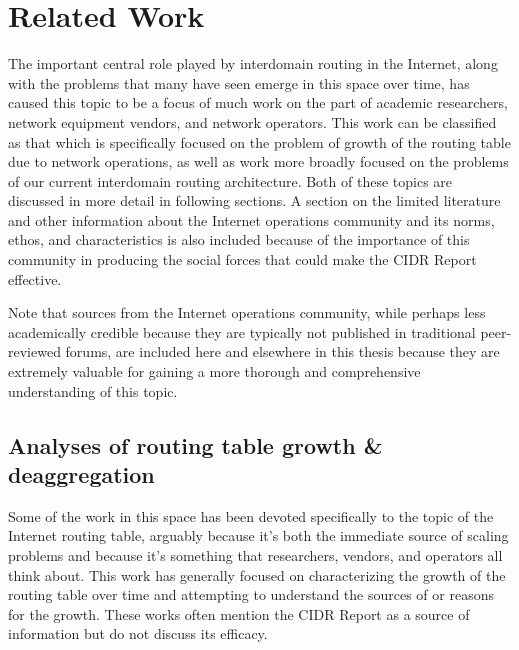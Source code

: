 \chapter{Related Work}
\label{chap:relwork}

The important central role played by interdomain routing in the Internet, along with the problems that many have seen emerge in this space over time, has caused this topic to be a focus of much work on the part of academic researchers, network equipment vendors, and network operators. This work can be classified as that which is specifically focused on the problem of growth of the routing table due to network operations, as well as work more broadly focused on the problems of our current interdomain routing architecture. Both of these topics are discussed in more detail in following sections. A section on the limited literature and other information about the Internet operations community and its norms, ethos, and characteristics is also included because of the importance of this community in producing the social forces that could make the CIDR Report effective.

Note that sources from the Internet operations community, while perhaps less academically credible because they are typically not published in traditional peer-reviewed forums, are included here and elsewhere in this thesis because they are extremely valuable for gaining a more thorough and comprehensive understanding of this topic.


\section{Analyses of routing table growth \& deaggregation}

Some of the work in this space has been devoted specifically to the topic of the Internet routing table, arguably because it's both the immediate source of scaling problems and because it's something that researchers, vendors, and operators all think about. This work has generally focused on characterizing the growth of the routing table over time and attempting to understand the sources of or reasons for the growth. These works often mention the CIDR Report as a source of information but do not discuss its efficacy.

